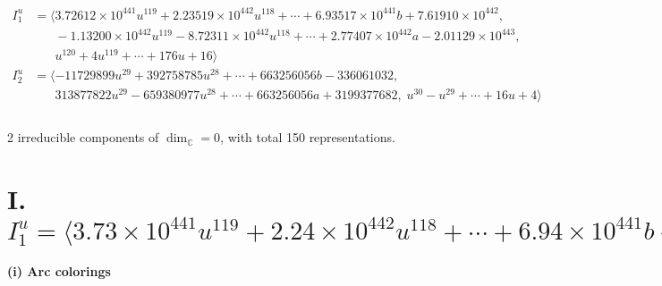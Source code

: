 \documentclass[1p]{elsarticle_modified}
\theoremstyle{definition}
\begin{document}
\begin{align*}
I^u_{1}&=\langle 
3.72612\times10^{441} u^{119}+2.23519\times10^{442} u^{118}+\cdots+6.93517\times10^{441} b+7.61910\times10^{442},\\
\phantom{I^u_{1}}&\phantom{= \langle  }-1.13200\times10^{442} u^{119}-8.72311\times10^{442} u^{118}+\cdots+2.77407\times10^{442} a-2.01129\times10^{443},\\
\phantom{I^u_{1}}&\phantom{= \langle  }u^{120}+4 u^{119}+\cdots+176 u+16\rangle \\
I^u_{2}&=\langle 
-11729899 u^{29}+392758785 u^{28}+\cdots+663256056 b-336061032,\\
\phantom{I^u_{2}}&\phantom{= \langle  }313877822 u^{29}-659380977 u^{28}+\cdots+663256056 a+3199377682,\;u^{30}- u^{29}+\cdots+16 u+4\rangle \\
\\
\end{align*}
\raggedright * 2 irreducible components of $\dim_{\mathbb{C}}=0$, with total 150 representations.\\
\newpage
\renewcommand{\arraystretch}{1}
\centering \section*{I. $I^u_{1}= \langle 3.73\times10^{441} u^{119}+2.24\times10^{442} u^{118}+\cdots+6.94\times10^{441} b+7.62\times10^{442},\;-1.13\times10^{442} u^{119}-8.72\times10^{442} u^{118}+\cdots+2.77\times10^{442} a-2.01\times10^{443},\;u^{120}+4 u^{119}+\cdots+176 u+16 \rangle$}
\flushleft \textbf{(i) Arc colorings}\\
\end{document}
